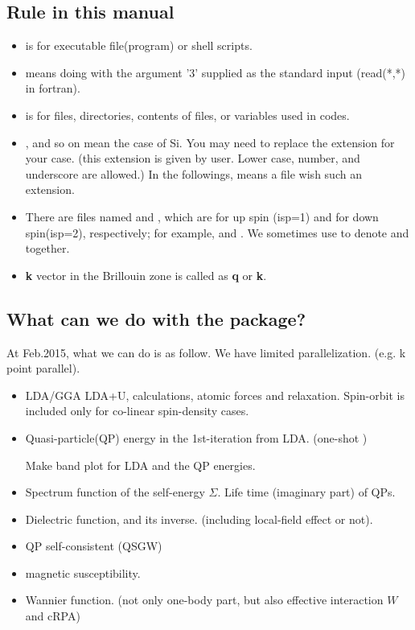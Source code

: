 \subsection{Rule in this manual} 
\begin{itemize}
\item
{} is for executable file(program) or shell scripts.
\item
{} means doing  
with the argument '3' supplied as the standard input (read(*,*) in fortran).
\item
{} is for files, 
directories, contents of files, or variables used in codes.
\item
{}, and so on mean the case of Si. 
You may need to replace the extension  for your case.
(this extension is given by user. 
Lower case, number, and underscore \io{[a-z0-9\_]} are allowed.)
In the followings,  means a file wish such an extension.
\item
 There are files named  and , which are
 for up spin (isp=1) and for down spin(isp=2), respectively; 
 for example,  and .
 We sometimes use  to denote  and 
     together.
\item
 {\bf k} vector in the Brillouin zone is called as {\bf q} or {\bf k}.
\end{itemize}
\vspace{-5mm}


\subsection{What can we do with the  package?}

At Feb.2015, what we can do is as follow. We have limited parallelization.
(e.g. k point parallel).

\begin{itemize}
\item LDA/GGA LDA+U, calculations, atomic forces and relaxation.
Spin-orbit is included only for co-linear spin-density cases.

\item 
Quasi-particle(QP) energy in the 1st-iteration from LDA.
(one-shot \GW)

Make band plot for LDA and the QP energies.

\item
Spectrum function of the self-energy $\Sigma$.
Life time (imaginary part) of QPs.

\item
Dielectric function, and its inverse.
(including local-field effect or not).

\item
QP self-consistent \GW (QSGW)

\item
magnetic susceptibility.

\item
Wannier function. (not only one-body part, but also effective
     interaction $W$ and cRPA)
\end{itemize}


